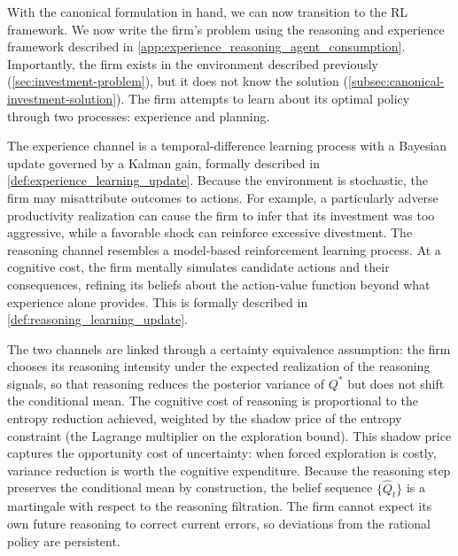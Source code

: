 With the canonical formulation in hand, we can now transition to the RL framework.
We now write the firm's problem using the reasoning and experience framework described
in \ref{app:experience_reasoning_agent_consumption}. Importantly, the firm exists
in the environment described previously (\ref{sec:investment-problem}), but 
it does not know the solution (\ref{subsec:canonical-investment-solution}).
The firm attempts to learn about its optimal policy through two processes: experience
and planning. 

The experience channel is a temporal-difference learning process with a Bayesian 
update governed by a Kalman gain, formally described in 
\ref{def:experience_learning_update}. Because the environment is stochastic, 
the firm may misattribute outcomes to actions. For example, a particularly adverse productivity 
realization can cause the firm to infer that its investment was too aggressive, 
while a favorable shock can reinforce excessive divestment. The reasoning channel 
resembles a model-based reinforcement learning process. At a cognitive cost, the 
firm mentally simulates candidate actions and their consequences, refining its 
beliefs about the action-value function beyond what experience alone provides. 
This is formally described in \ref{def:reasoning_learning_update}.

The two channels are linked through a certainty equivalence assumption: the firm 
chooses its reasoning intensity under the expected realization of the reasoning 
signals, so that reasoning reduces the posterior variance of $Q^*$ but does not 
shift the conditional mean. The cognitive cost of reasoning is proportional to 
the entropy reduction achieved, weighted by the shadow price of the entropy 
constraint (the Lagrange multiplier on the exploration bound). This shadow price 
captures the opportunity cost of uncertainty: when forced exploration is costly, 
variance reduction is worth the cognitive expenditure. Because the reasoning step 
preserves the conditional mean by construction, the belief sequence 
$\{\hat{Q}_t\}$ is a martingale with respect to the reasoning filtration. 
The firm cannot expect its own future reasoning to correct current errors, so 
deviations from the rational policy are persistent.

